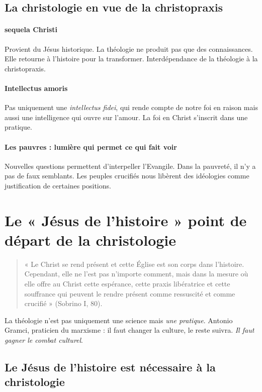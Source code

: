 \subsection{La christologie en vue de la christopraxis}

\paragraph{sequela Christi} Provient du Jésus historique. La théologie ne produit pas que des connaissances. Elle retourne à l'histoire pour la transformer.
Interdépendance de la théologie à la christopraxis. 

\paragraph{Intellectus amoris} Pas uniquement une \textit{intellectus fidei}, qui rende compte de notre foi en raison mais aussi une intelligence qui ouvre sur l'amour. 
La foi en Christ s'inscrit dans une pratique. 


\paragraph{Les pauvres : lumière qui permet ce qui fait voir} Nouvelles questions permettent d'interpeller l'Evangile. Dans la pauvreté, il n'y a pas de faux semblants. Les peuples crucifiés nous libèrent des idéologies comme justification de certaines positions.

 \section{Le « Jésus de l’histoire » point de départ de la christologie}

\begin{quote}
    « Le Christ se rend présent et cette Église est son corps dans l’histoire. Cependant, elle ne l’est pas
n’importe comment, mais dans la mesure où elle offre au Christ cette espérance, cette praxis
libératrice et cette souffrance qui peuvent le rendre présent comme ressuscité et comme crucifié »
(Sobrino I, 80).
\end{quote}

La théologie n'est pas uniquement une science mais \textit{une pratique}. 
Antonio Gramci, praticien du marxisme : il faut changer la culture, le reste suivra. \textit{Il faut gagner le combat culturel}.



\subsection{Le Jésus de l’histoire est nécessaire à la christologie}

